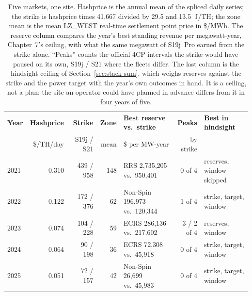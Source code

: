 \begin{table}[htbp]
  \centering
  \scriptsize
  \setlength{\tabcolsep}{2.2pt}
  \begin{tabular}{lrrr>{\raggedright\arraybackslash}p{2.5cm}r>{\raggedright\arraybackslash}p{1.8cm}}
    \hline
    \textbf{Year} & \textbf{Hashprice} & \textbf{Strike} & \textbf{Zone} & \textbf{Best reserve vs.\ strike} & \textbf{Peaks} & \textbf{Best in hindsight} \\
     & \$/TH/day & S19j / S21 & mean & \$ per MW-year & by strike & \\
    \hline
    2021 & 0.310 & 439 / 958 & 148 & RRS 2,735,205 vs.\ 950,401 & 0 of 4 & reserves, window skipped \\
    2022 & 0.122 & 172 / 376 & 62 & Non-Spin 196,973 vs.\ 120,344 & 1 of 4 & strike, target, window \\
    2023 & 0.074 & 104 / 228 & 59 & ECRS 286,136 vs.\ 217,602 & 3 / 2 of 4 & reserves, window \\
    2024 & 0.064 & 90 / 198 & 36 & ECRS 72,308 vs.\ 45,918 & 0 of 4 & strike, target, window \\
    2025 & 0.051 & 72 / 157 & 42 & Non-Spin 26,699 vs.\ 45,983 & 0 of 4 & strike, target, window \\
    \hline
  \end{tabular}
  \caption{Five markets, one site. Hashprice is the annual mean of the spliced daily series; the strike is hashprice times 41,667 divided by 29.5 and 13.5~J/TH; the zone mean is the mean LZ\_WEST real-time settlement point price in \$/MWh. The reserve column compares the year's best standing revenue per megawatt-year, Chapter~7's ceiling, with what the same megawatt of S19j~Pro earned from the strike alone. ``Peaks'' counts the official 4CP intervals the strike would have paused on its own, S19j / S21 where the fleets differ. The last column is the hindsight ceiling of Section~\ref{sec:stack-sum}, which weighs reserves against the strike and the power target with the year's own outcomes in hand. It is a ceiling, not a plan: the site an operator could have planned in advance differs from it in four years of five.} %
  \label{tab:stack-markets}
\end{table}

